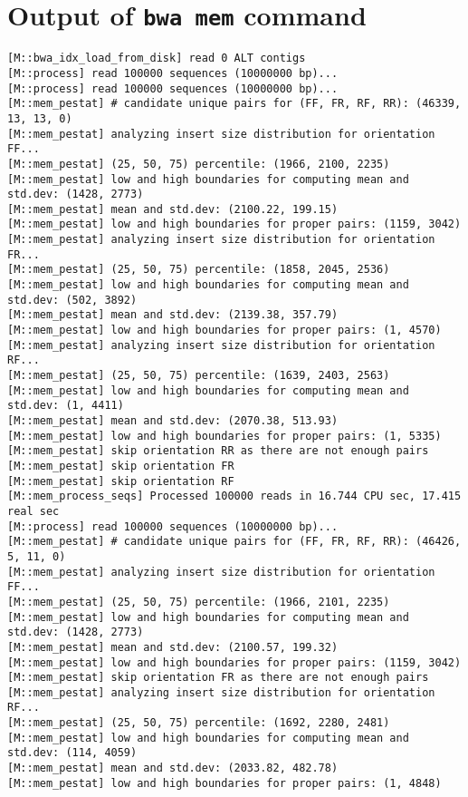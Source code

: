 \chapter{Output of \texttt{bwa mem} command}\label{app:bwamem}
\begin{lstlisting}
[M::bwa_idx_load_from_disk] read 0 ALT contigs
[M::process] read 100000 sequences (10000000 bp)...
[M::process] read 100000 sequences (10000000 bp)...
[M::mem_pestat] # candidate unique pairs for (FF, FR, RF, RR): (46339, 13, 13, 0)
[M::mem_pestat] analyzing insert size distribution for orientation FF...
[M::mem_pestat] (25, 50, 75) percentile: (1966, 2100, 2235)
[M::mem_pestat] low and high boundaries for computing mean and std.dev: (1428, 2773)
[M::mem_pestat] mean and std.dev: (2100.22, 199.15)
[M::mem_pestat] low and high boundaries for proper pairs: (1159, 3042)
[M::mem_pestat] analyzing insert size distribution for orientation FR...
[M::mem_pestat] (25, 50, 75) percentile: (1858, 2045, 2536)
[M::mem_pestat] low and high boundaries for computing mean and std.dev: (502, 3892)
[M::mem_pestat] mean and std.dev: (2139.38, 357.79)
[M::mem_pestat] low and high boundaries for proper pairs: (1, 4570)
[M::mem_pestat] analyzing insert size distribution for orientation RF...
[M::mem_pestat] (25, 50, 75) percentile: (1639, 2403, 2563)
[M::mem_pestat] low and high boundaries for computing mean and std.dev: (1, 4411)
[M::mem_pestat] mean and std.dev: (2070.38, 513.93)
[M::mem_pestat] low and high boundaries for proper pairs: (1, 5335)
[M::mem_pestat] skip orientation RR as there are not enough pairs
[M::mem_pestat] skip orientation FR
[M::mem_pestat] skip orientation RF
[M::mem_process_seqs] Processed 100000 reads in 16.744 CPU sec, 17.415 real sec
[M::process] read 100000 sequences (10000000 bp)...
[M::mem_pestat] # candidate unique pairs for (FF, FR, RF, RR): (46426, 5, 11, 0)
[M::mem_pestat] analyzing insert size distribution for orientation FF...
[M::mem_pestat] (25, 50, 75) percentile: (1966, 2101, 2235)
[M::mem_pestat] low and high boundaries for computing mean and std.dev: (1428, 2773)
[M::mem_pestat] mean and std.dev: (2100.57, 199.32)
[M::mem_pestat] low and high boundaries for proper pairs: (1159, 3042)
[M::mem_pestat] skip orientation FR as there are not enough pairs
[M::mem_pestat] analyzing insert size distribution for orientation RF...
[M::mem_pestat] (25, 50, 75) percentile: (1692, 2280, 2481)
[M::mem_pestat] low and high boundaries for computing mean and std.dev: (114, 4059)
[M::mem_pestat] mean and std.dev: (2033.82, 482.78)
[M::mem_pestat] low and high boundaries for proper pairs: (1, 4848)

\end{lstlisting}
